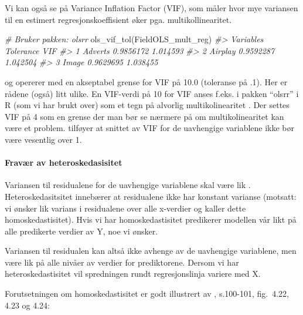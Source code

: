 \documentclass[
]{article}
\newenvironment{Shaded}{\begin{snugshade}}{\end{snugshade}}
\newcommand{\CommentTok}[1]{\textcolor[rgb]{0.56,0.35,0.01}{\textit{#1}}}
\newcommand{\FunctionTok}[1]{\textcolor[rgb]{0.00,0.00,0.00}{#1}}
\newcommand{\NormalTok}[1]{#1}
\begin{document}
Vi kan også se på Variance Inflation Factor (VIF), som måler hvor mye variansen til en estimert regresjonskoeffisient øker pga. multikollinearitet.

\begin{Shaded}
\begin{Highlighting}[]
\CommentTok{\# Bruker pakken: olsrr}
\FunctionTok{ols\_vif\_tol}\NormalTok{(FieldOLS\_mult\_reg)}
\CommentTok{\#\textgreater{}   Variables Tolerance      VIF}
\CommentTok{\#\textgreater{} 1   Adverts 0.9856172 1.014593}
\CommentTok{\#\textgreater{} 2   Airplay 0.9592287 1.042504}
\CommentTok{\#\textgreater{} 3     Image 0.9629695 1.038455}
\end{Highlighting}
\end{Shaded}

\citet{myersClassicalModernRegression1990} og \citet{hairjr.MultivariateDataAnalysis2010} opererer med en akseptabel grense for VIF på 10.0 (toleranse på .1). Her er rådene (også) litt ulike. En VIF-verdi på 10 for VIF anses f.eks. i pakken ``olsrr'' i R (som vi har brukt over) som et tegn på alvorlig multikolinearitet \citep[jfr.][]{belsleyRegressionDiagnosticsIdentifying1980}. Der settes VIF på 4 som en grense der man bør se nærmere på om multikolinearitet kan være et problem. \citet{bowermanLinearStatisticalModels1990} tilføyer at snittet av VIF for de uavhengige variablene ikke bør være vesentlig over 1.

\hypertarget{fravuxe6r-av-heteroskedasisitet}{%
\paragraph{Fravær av heteroskedasisitet}\label{fravuxe6r-av-heteroskedasisitet}}

Variansen til residualene for de uavhengige variablene skal være lik \citep{milesApplyingRegressionCorrelation2001}. Heteroskedasitsitet innebærer at residualene ikke har konstant varianse (motsatt: vi ønsker lik varians i residualene over alle x-verdier og kaller dette homoskedastisitet). Hvis vi har homoskedastisitet predikerer modellen vår likt på alle predikerte verdier av Y, noe vi ønsker.

Variansen til residualen kan altså ikke avhenge av de uavhengige variablene, men være lik på alle nivåer av verdier for prediktorene. Dersom vi har heteroskedastisitet vil spredningen rundt regresjonslinja variere med X.

Forutsetningen om homoskedastisitet er godt illustrert av \citet{milesApplyingRegressionCorrelation2001}, s.100-101, fig.~4.22, 4.23 og 4.24:
\end{document}
